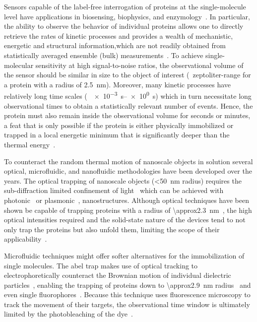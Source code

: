 Sensors capable of the label-free interrogation of proteins at the single-molecule level have applications in
biosensing, biophysics, and enzymology~\cite{Gooding-2016,Xie-2001,Willems-VanMeervelt-2017}. In particular,
the ability to observe the behavior of individual proteins allows one to directly retrieve the rates of
kinetic processes and provides a wealth of mechanistic, energetic and structural information,which are not
readily obtained from statistically averaged ensemble (bulk) measurements~\cite{Gooding-2016}. To achieve
single-molecular sensitivity at high signal-to-noise ratios, the observational volume of the sensor should be
similar in size to the object of interest (\ie~zeptoliter-range for a protein with a radius of \SI{2.5}{\nm}).
Moreover, many kinetic processes have relatively long time scales (\eg~\SIrange{e-3}{e0}{\second}) which in
turn necessitate long observational times to obtain a statistically relevant number of events. Hence, the
protein must also remain inside the observational volume for seconds or minutes, a feat that is only possible
if the protein is either physically immobilized or trapped in a local energetic minimum that is significantly
deeper than the thermal energy~\cite{Krishnan-2010,Myers-2015}.

To counteract the random thermal motion of nanoscale objects in solution several optical, microfluidic, and
nanofluidic methodologies have been developed over the years. The optical trapping of nanoscale objects
(\SI{<50}{\nm} radius) requires the sub-diffraction limited confinement of light~\cite{Neuman-2004,Baker-2017,
Bradac-2018} which can be achieved with photonic~\cite{Yang-2009,Mandal-2010} or
plasmonic~\cite{Juan-2009,Chen-2011,
Pang-2011,Bergeron-2013,Kotnala-2014,Kerman-2015,Chen-2018,Verschueren-2019}, nanostructures. Although optical
techniques have been shown be capable of trapping proteins with a radius of
\SI{\approx2.3}{\nm}~\cite{Kotnala-2014}, the high optical intensities required and the solid-state nature of
the devices tend to not only trap the proteins but also unfold them, limiting the scope of their
applicability~\cite{Pang-2011, Verschueren-2019}.

Microfluidic techniques might offer softer alternatives for the immobilization of single molecules. The
\gls{abel} trap makes use of optical tracking to electrophoretically counteract the Brownian motion of
individual dielectric particles~\cite{Cohen-2005,Cohen-2006,Goldsmith-2010, Goldsmith-2011}, enabling the
trapping of proteins down to \SI{\approx2.9}{\nm} radius~\cite{Goldsmith-2011} and even single
fluorophores~\cite{Fields-2011}. Because this technique uses fluorescence microscopy to track the movement of
their targets, the observational time window is ultimately limited by the photobleaching of the
dye~\cite{Cohen-2005,Goldsmith-2010}.

